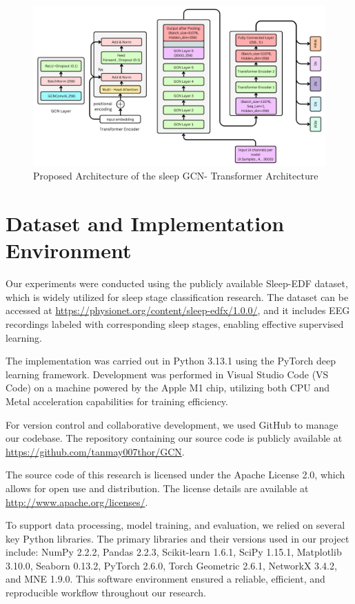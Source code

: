 \begin{figure}
	\centering
	\includegraphics[width=.9\linewidth]{"img/paper_3/Graph Convolution Neural Network -SleepGCN_Transformer Architechture"}
	\caption{Proposed Architecture of the sleep GCN- Transformer Architecture}
	\label{fig:graph-convolution-neural-network--sleepgcntransformer-architechture}
\end{figure}



\section{Dataset and Implementation Environment}

Our experiments were conducted using the publicly available Sleep-EDF dataset, which is widely utilized for sleep stage classification research. The dataset can be accessed at \url{https://physionet.org/content/sleep-edfx/1.0.0/}, and it includes EEG recordings labeled with corresponding sleep stages, enabling effective supervised learning.

The implementation was carried out in Python 3.13.1 using the PyTorch deep learning framework. Development was performed in Visual Studio Code (VS Code) on a machine powered by the Apple M1 chip, utilizing both CPU and Metal acceleration capabilities for training efficiency.

For version control and collaborative development, we used GitHub to manage our codebase. The repository containing our source code is publicly available at \url{https://github.com/tanmay007thor/GCN}.

The source code of this research is licensed under the Apache License 2.0, which allows for open use and distribution. The license details are available at \url{http://www.apache.org/licenses/}.

To support data processing, model training, and evaluation, we relied on several key Python libraries. The primary libraries and their versions used in our project include: NumPy 2.2.2, Pandas 2.2.3, Scikit-learn 1.6.1, SciPy 1.15.1, Matplotlib 3.10.0, Seaborn 0.13.2, PyTorch 2.6.0, Torch Geometric 2.6.1, NetworkX 3.4.2, and MNE 1.9.0. This software environment ensured a reliable, efficient, and reproducible workflow throughout our research.



